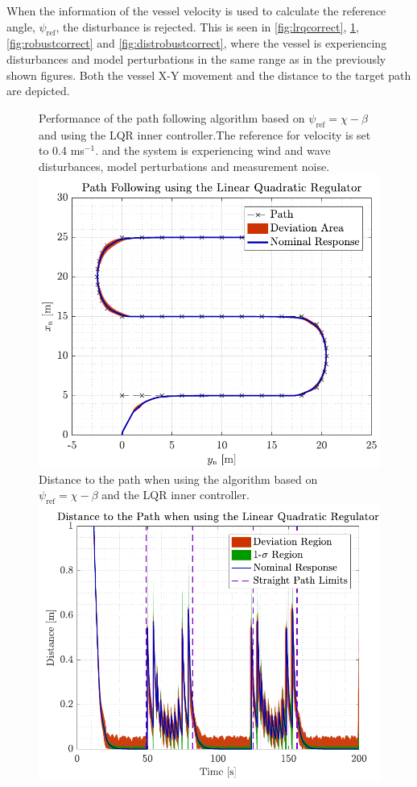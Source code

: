 When the information of the vessel velocity is used to calculate the reference angle, $\psi_\mathrm{ref}$, the disturbance is rejected. This is seen in \autoref{fig:lrqcorrect}, \ref{fig:distlqr}, \ref{fig:robustcorrect} and \ref{fig:distrobustcorrect}, where the vessel is experiencing disturbances and model perturbations in the same range as in the previously shown figures. Both the vessel X-Y movement and the distance to the target path are depicted. 

\begin{figure}[H]
	\captionbox 
	{            
		Performance of the path following algorithm based on $\psi_\mathrm{ref}=\chi-\beta$ and using the LQR inner controller.The reference for velocity is set to \num{0.4} ms$^{-1}$. and the system is experiencing wind and wave disturbances, model perturbations and measurement noise.                
		\label{fig:lrqcorrect}                                  
	}                                                                 
	{                                                                  
		\includegraphics[width=.45\textwidth]{figures/path_lqr}         
	}                                                                    
	\hspace{5pt}                                                          
	\captionbox 
	{       
		Distance to the path when using the algorithm based on $\psi_\mathrm{ref}=\chi-\beta$ and the LQR inner controller. \label{fig:distlqr}                                   
	}                                                     
	{                                                                        
		\includegraphics[width=.45\textwidth]{figures/dist_lqr}            
	}                                                                            
\end{figure}
